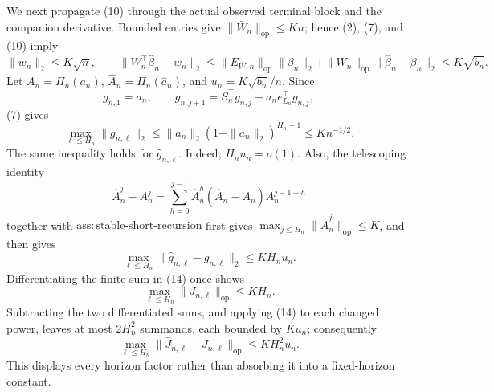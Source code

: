 We next propagate (10) through the actual observed terminal block and the companion derivative.  Bounded entries give \(\|\bar W_n\|_{\mathrm{op}}\le Kn\); hence (2), (7), and (10) imply
\[
 \|w_n\|_2\le K\sqrt n,\qquad
 \|W_n^\top\widehat\beta_n-w_n\|_2
 \le\|E_{W,n}\|_{\mathrm{op}}\|\beta_n\|_2
    +\|W_n\|_{\mathrm{op}}\|\widehat\beta_n-\beta_n\|_2
 \le K\sqrt{b_n}.
 \tag{12}
\]
Let \(A_n=\Pi_n(a_n)\), \(\widehat A_n=\Pi_n(\widehat a_n)\), and \(u_n=K\sqrt{b_n}/n\).  Since
\[
 g_{n,1}=a_n,\qquad
 g_{n,j+1}=S_n^\top g_{n,j}+a_n e_{L_n}^\top g_{n,j},
\]
(7) gives
\[
 \max_{\ell\le H_n}\|g_{n,\ell}\|_2
 \le \|a_n\|_2(1+\|a_n\|_2)^{H_n-1}\le K n^{-1/2}.
 \tag{13}
\]
The same inequality holds for \(\widehat g_{n,\ell}\).  Indeed, \(H_nu_n=o(1)\).  Also, the telescoping identity
\[
 \widehat A_n^j-A_n^j
 =\sum_{h=0}^{j-1}\widehat A_n^h(\widehat A_n-A_n)A_n^{j-1-h}
 \tag{14}
\]
together with \(\mathrm{ass{:}stable\mbox{-}short\mbox{-}recursion}\) first gives
\(\max_{j\le H_n}\|\widehat A_n^j\|_{\mathrm{op}}\le K\), and then gives
\[
 \max_{\ell\le H_n}\|\widehat g_{n,\ell}-g_{n,\ell}\|_2
 \le KH_nu_n.
 \tag{15}
\]
Differentiating the finite sum in (14) once shows
\[
 \max_{\ell\le H_n}\|J_{n,\ell}\|_{\mathrm{op}}\le KH_n.
 \tag{16}
\]
Subtracting the two differentiated sums, and applying (14) to each changed power, leaves at most \(2H_n^2\) summands, each bounded by \(Ku_n\); consequently
\[
 \max_{\ell\le H_n}\|\widehat J_{n,\ell}-J_{n,\ell}\|_{\mathrm{op}}
 \le KH_n^2u_n.
 \tag{17}
\]
This displays every horizon factor rather than absorbing it into a fixed-horizon constant.

